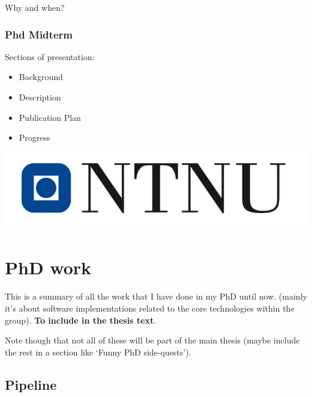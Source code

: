 \documentclass[12pt,]{book}
\providecommand{\tightlist}{%
  \setlength{\itemsep}{0pt}\setlength{\parskip}{0pt}}
\begin{document}
Why and when?

\hypertarget{phd-midterm}{%
\subsection{Phd Midterm}\label{phd-midterm}}

Sections of presentation:

\begin{itemize}
\tightlist
\item
  Background
\item
  Description
\item
  Publication Plan
\item
  Progress
\end{itemize}

\begin{center}\includegraphics[width=0.5\linewidth]{img/NTNU-logo} \end{center}

\hypertarget{work}{%
\chapter{PhD work}\label{work}}

This is a summary of all the work that I have done in my PhD until now.
(mainly it's about software implementations related to the core technologies
within the group). \textbf{To include in the thesis text}.

Note though that not all of these will be part of the main thesis (maybe include the
rest in a section like `Funny PhD side-quests').

\hypertarget{pipeline}{%
\section{Pipeline}\label{pipeline}}
\end{document}
